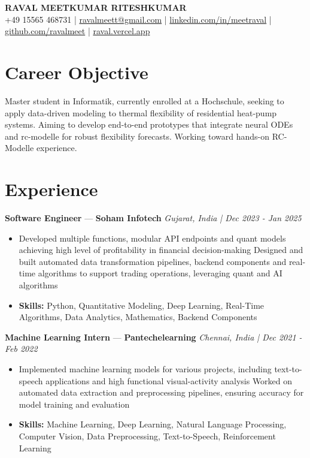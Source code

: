 \documentclass[a4paper,10pt]{article}
\begin{document}
\begin{center}
  {\Large\bfseries RAVAL MEETKUMAR RITESHKUMAR}\\[2pt]
  {\small +49 15565 468731 \;|\; \href{mailto:ravalmeett@gmail.com}{ravalmeett@gmail.com} \;|\; \href{https://www.linkedin.com/in/meetraval/}{linkedin.com/in/meetraval} \;|\; \href{https://github.com/ravalmeet}{github.com/ravalmeet} \;|\; \href{https://raval.vercel.app/}{raval.vercel.app}}
\end{center}
\vspace{-3pt}

\section*{Career Objective}
Master student in Informatik, currently enrolled at a Hochschule, seeking to apply data-driven modeling to thermal flexibility of residential heat-pump systems. Aiming to develop end-to-end prototypes that integrate neural ODEs and rc-modelle for robust flexibility forecasts. Working toward hands-on RC-Modelle experience.\par

\section*{Experience}
\textbf{Software Engineer} — \textbf{Soham Infotech} \hfill \textit{Gujarat, India \;|\; Dec 2023 - Jan 2025}\par
\vspace{1pt}
\begin{itemize}
  \item Developed multiple functions, modular API endpoints and quant models achieving high level of profitability in financial decision-making Designed and built automated data transformation pipelines, backend components and real-time algorithms to support trading operations, leveraging quant and AI algorithms
  \item \textbf{Skills:} Python, Quantitative Modeling, Deep Learning, Real-Time Algorithms, Data Analytics, Mathematics, Backend Components
\end{itemize}
\vspace{3pt}
\textbf{Machine Learning Intern} — \textbf{Pantechelearning} \hfill \textit{Chennai, India \;|\; Dec 2021 - Feb 2022}\par
\vspace{1pt}
\begin{itemize}
  \item Implemented machine learning models for various projects, including text-to-speech applications and high functional visual-activity analysis Worked on automated data extraction and preprocessing pipelines, ensuring accuracy for model training and evaluation
  \item \textbf{Skills:} Machine Learning, Deep Learning, Natural Language Processing, Computer Vision, Data Preprocessing, Text-to-Speech, Reinforcement Learning
\end{itemize}
\end{document}
